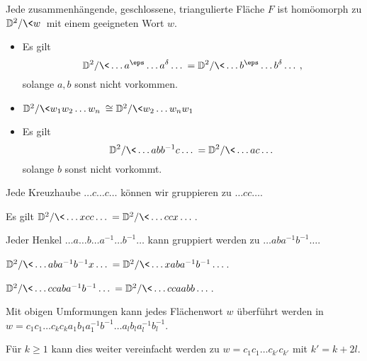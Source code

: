 \begin{lem}
	Jede zusammenhängende, geschlossene, triangulierte Fläche $F$ ist homöomorph zu $\D^2 / \<w\>$ mit einem geeigneten Wort $w$.
\end{lem}

\begin{lem}
	\begin{itemize}
		\item
			Es gilt
			\[
				\D^2 / \<\dotsc a^\eps \dotsc a^\delta \dotsc \>
				= \D^2 / \<\dotsc b^\eps \dotsc b^\delta \dotsc \>,
			\]
			solange $a, b$ sonst nicht vorkommen.
		\item
			$\D^2 / \<w_1 w_2 \dotsc w_n\> \homeomorphic \D^2 / \<w_2 \dotsc w_n w_1\>$
		\item
			Es gilt
			\[
				\D^2 / \<\dotsc abb^{-1}c \dotsc \> = \D^2 / \< \dotsc ac \dotsc \>
			\]
			solange $b$ sonst nicht vorkommt.
	\end{itemize}
\end{lem}

\begin{lem}
	Jede Kreuzhaube $\dotsc c \dotsc c \dotsc$ können wir gruppieren zu $\dotsc cc \dotsc$.
\end{lem}

\begin{lem}
	Es gilt $\D^2 / \<\dotsc xcc \dotsc \> = \D^2 / \< \dotsc ccx \dotsc \>$.
\end{lem}

\begin{lem}
	Jeder Henkel $\dotsc a  \dotsc b \dotsc a^{-1} \dotsc b^{-1} \dotsc$ kann gruppiert werden zu $\dotsc aba^{-1}b^{-1} \dotsc$.
\end{lem}

\begin{lem}
	$\D^2 / \<\dotsc aba^{-1}b^{-1}x\dotsc \> =  \D^2 / \< \dotsc x aba^{-1}b^{-1} \dotsc \>$.
\end{lem}

\begin{lem}
	$\D^2 / \<\dotsc ccaba^{-1}b^{-1}\dotsc \> =  \D^2 / \< \dotsc cc aabb \dotsc \>$.
\end{lem}

\begin{st}
	Mit obigen Umformungen kann jedes Flächenwort $w$ überführt werden in $w = c_1c_1 \dotsc c_k c_k a_1b_1a_1^{-1}b^{-1} \dotsc a_l b_l a_l^{-1} b_l^{-1}$.

	Für $k \ge 1$ kann dies weiter vereinfacht werden zu $w = c_1c_1 \dotsc c_{k'} c_{k'}$ mit $k' = k + 2l$.
\end{st}

